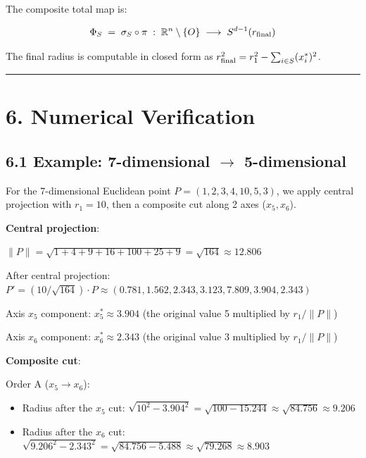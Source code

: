 \documentclass[a4paper,11pt]{article}
\theoremstyle{definition}
\theoremstyle{remark}
\providecommand{\tightlist}{%
  \setlength{\itemsep}{0pt}\setlength{\parskip}{0pt}}
\begin{document}
The composite total map is:

\[
\Phi_{S} \;=\; \sigma_S \circ \pi \;:\; \mathbb{R}^{n} \setminus \{O\} \;\longrightarrow\; S^{d-1}(r_{\rm final})
\]

The final radius is computable in closed form as
\(r_{\rm final}^2 = r_1^2 - \sum_{i \in S}(x_i^{*})^2\).

\begin{center}\rule{0.5\linewidth}{0.5pt}\end{center}

\section{6. Numerical Verification}\label{numerical-verification}

\subsection{\texorpdfstring{6.1 Example: 7-dimensional \(\to\)
5-dimensional}{6.1 Example: 7-dimensional \textbackslash to 5-dimensional}}\label{example-7-dimensional-to-5-dimensional}

For the 7-dimensional Euclidean point \(P = (1, 2, 3, 4, 10, 5, 3)\), we
apply central projection with \(r_1 = 10\), then a composite cut along 2
axes (\(x_5, x_6\)).

\textbf{Central projection}:

\(\lVert P \rVert = \sqrt{1 + 4 + 9 + 16 + 100 + 25 + 9} = \sqrt{164} \approx 12.806\)

After central projection:
\(P' = (10/\sqrt{164}) \cdot P \approx (0.781, 1.562, 2.343, 3.123, 7.809, 3.904, 2.343)\)

Axis \(x_5\) component: \(x_5^{*} \approx 3.904\) (the original value 5
multiplied by \(r_1 / \lVert P \rVert\))

Axis \(x_6\) component: \(x_6^{*} \approx 2.343\) (the original value 3
multiplied by \(r_1 / \lVert P \rVert\))

\textbf{Composite cut}:

Order A (\(x_5 \to x_6\)):

\begin{itemize}
\tightlist
\item
  Radius after the \(x_5\) cut:
  \(\sqrt{10^2 - 3.904^2} = \sqrt{100 - 15.244} \approx \sqrt{84.756} \approx 9.206\)
\item
  Radius after the \(x_6\) cut:
  \(\sqrt{9.206^2 - 2.343^2} = \sqrt{84.756 - 5.488} \approx \sqrt{79.268} \approx 8.903\)
\end{itemize}
\end{document}
